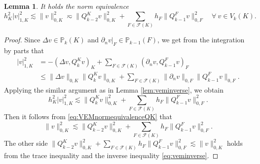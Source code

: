 \documentclass[10pt]{amsart}
\newtheorem{lemma}[theorem]{Lemma}
\numberwithin{equation}{section}
\begin{document}
\begin{lemma}
It holds the norm equivalence
\begin{equation}\label{eq:Vknormequivalence}
h_K^2|v|_{1,K}^2\lesssim\|v\|_{0,K}^2\eqsim \|Q_{k-2}^Kv\|_{0,K}^2+\sum_{F\in\mathcal F(K)}h_F\|Q_{k-1}^Fv\|_{0,F}^2 \quad\forall~v\in V_k(K).
\end{equation}  
\end{lemma}
\begin{proof}
Since $\Delta v\in\mathbb P_{k}(K)$ and $\partial_nv|_F\in\mathbb P_{k-1}(F)$, we get from the integration by parts that
\begin{align*}
|v|_{1,K}^2&=-(\Delta v,Q_k^Kv)_K+\sum_{F\in\mathcal F(K)}(\partial_nv,Q_{k-1}^Fv)_{F} \\
&\leq\|\Delta v\|_{0,K}\|Q_k^Kv\|_{0,K}+\sum_{F\in\mathcal F(K)}\|\partial_nv\|_{0,F}\|Q_{k-1}^Fv\|_{0,F}.
\end{align*}
Applying the similar argument as in Lemma \ref{lem:veminverse}, we obtain
\[
h_K^2|v|_{1,K}^2\lesssim \|Q_k^Kv\|_{0,K}^2+\sum_{F\in\mathcal F(K)}h_F\|Q_{k-1}^Fv\|_{0,F}^2.
\]
Then it follows from \eqref{eq:VEMnormequivalenceQK} that
\[
\|v\|_{0,K}^2\lesssim \|Q_{k-2}^Kv\|_{0,K}^2+\sum_{F\in\mathcal F(K)}h_F\|Q_{k-1}^Fv\|_{0,F}^2.
\]
The other side $\|Q_{k-2}^Kv\|_{0,K}^2+\sum\limits_{F\in\mathcal F(K)}h_F\|Q_{k-1}^Fv\|_{0,F}^2\lesssim \|v\|_{0,K}^2$ holds from the trace inequality and the inverse inequality \eqref{eq:veminverse}.
\end{proof}


   
\end{document}
